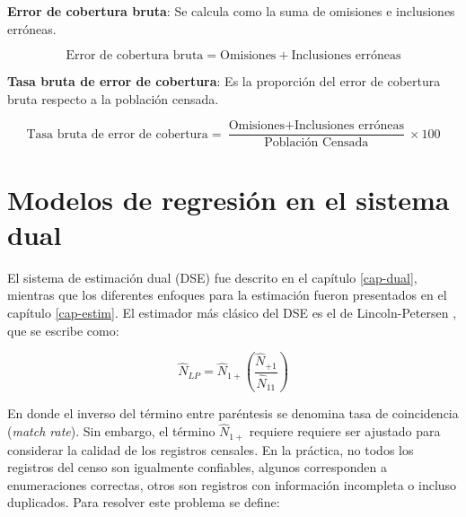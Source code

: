 \documentclass[
  12pt,
]{book}
\begin{document}
\textbf{Error de cobertura bruta}: Se calcula como la suma de omisiones e inclusiones erróneas.

\[
\text{Error de cobertura bruta} = \text{Omisiones} + \text{Inclusiones erróneas}
\]

\textbf{Tasa bruta de error de cobertura}: Es la proporción del error de cobertura bruta respecto a la población censada.

\[
\text{Tasa bruta de error de cobertura} = \frac{\text{Omisiones} + \text{Inclusiones erróneas}}{\text{Población Censada}} \times 100
\]

\chapter{Modelos de regresión en el sistema dual}\label{cap-reg}

El sistema de estimación dual (DSE) fue descrito en el capítulo \ref{cap-dual}, mientras que los diferentes enfoques para la estimación fueron presentados en el capítulo \ref{cap-estim}. El estimador más clásico del DSE es el de Lincoln-Petersen \citep{petersen1896}, que se escribe como:

\[\hat{N}_{LP} = \hat{N}_{1+} \left( \frac{\hat{N}_{+1}}{\hat{N}_{11}} \right)\]

En donde el inverso del término entre paréntesis se denomina tasa de coincidencia (\emph{match rate}). Sin embargo, el término
\(\hat{N}_{1+}\) requiere requiere ser ajustado para considerar la calidad de los registros censales. En la práctica, no todos los registros del censo son igualmente confiables, algunos corresponden a enumeraciones correctas, otros son registros con información incompleta o incluso duplicados. Para resolver este problema se define:
\end{document}
